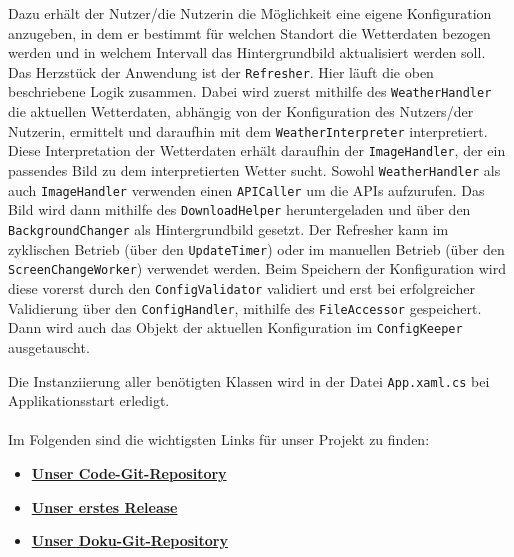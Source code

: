 Dazu erhält der Nutzer/die Nutzerin die Möglichkeit eine eigene Konfiguration anzugeben, in dem er bestimmt für welchen Standort die Wetterdaten bezogen werden und in welchem Intervall das Hintergrundbild aktualisiert werden soll. Das Herzstück der Anwendung ist der \texttt{Refresher}. Hier läuft die oben beschriebene Logik zusammen. Dabei wird zuerst mithilfe des \texttt{WeatherHandler} die aktuellen Wetterdaten, abhängig von der Konfiguration des Nutzers/der Nutzerin, ermittelt und daraufhin mit dem \texttt{WeatherInterpreter} interpretiert. Diese Interpretation der Wetterdaten erhält daraufhin der \texttt{ImageHandler}, der ein passendes Bild zu dem interpretierten Wetter sucht. Sowohl \texttt{WeatherHandler} als auch \texttt{ImageHandler} verwenden einen \texttt{APICaller} um die APIs aufzurufen. Das Bild wird dann mithilfe des \texttt{DownloadHelper} heruntergeladen und über den \texttt{BackgroundChanger} als Hintergrundbild gesetzt. Der Refresher kann im zyklischen Betrieb (über den \texttt{UpdateTimer}) oder im manuellen Betrieb (über den \texttt{ScreenChangeWorker}) verwendet werden. Beim Speichern der Konfiguration wird diese vorerst durch den \texttt{ConfigValidator} validiert und erst bei erfolgreicher Validierung über den \texttt{ConfigHandler}, mithilfe des \texttt{FileAccessor} gespeichert. Dann wird auch das Objekt der aktuellen Konfiguration im \texttt{ConfigKeeper} ausgetauscht.

Die Instanziierung aller benötigten Klassen wird in der Datei \texttt{App.xaml.cs} bei Applikationsstart erledigt.\\
\\
Im Folgenden sind die wichtigsten Links für unser Projekt zu finden:
\begin{itemize}
\item \href{https://github.com/Bronzila/WeatherWallpaper}{\color{blue} \textbf{Unser Code-Git-Repository}}
\item \href{https://github.com/Bronzila/WeatherWallpaper/releases/tag/V1}{\color{blue} \textbf{Unser erstes Release}}
\item \href{https://github.com/gierle/WeatherWallpaperDocumentation}{\color{blue} \textbf{Unser Doku-Git-Repository}}
\end{itemize}